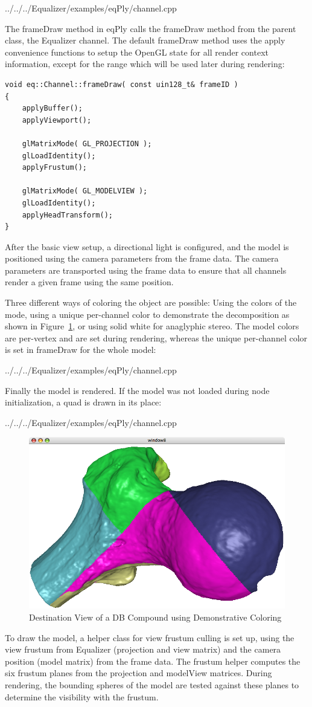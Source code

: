 \documentclass[10pt,a4]{scrartcl}
\newcommand{\fig}[1]{Figure~\ref{#1}}
\begin{document}
{\footnotesize
  {../../../Equalizer/examples/eqPly/channel.cpp}}

The \textsf{frameDraw} method in \textsf{eqPly} calls the \textsf{frameDraw}
method from the parent class, the Equalizer channel. The default
\textsf{frameDraw} method uses the apply convenience functions to setup the
OpenGL state for all render context information, except for the range which will
be used later during rendering:

{\footnotesize\begin{lstlisting}
void eq::Channel::frameDraw( const uin128_t& frameID )
{
    applyBuffer();
    applyViewport();
    
    glMatrixMode( GL_PROJECTION );
    glLoadIdentity();
    applyFrustum();

    glMatrixMode( GL_MODELVIEW );
    glLoadIdentity();
    applyHeadTransform();
}
\end{lstlisting}}

After the basic view setup, a directional light is configured, and the
model is positioned using the camera parameters from the frame data. The
camera parameters are transported using the frame data to ensure
that all channels render a given frame using the same position.

Three different ways of coloring the object are possible: Using the
colors of the mode, using a unique per-channel color to demonstrate the
decomposition as shown in \fig{fDBDest}, or using solid white for
anaglyphic stereo. The model colors are per-vertex and are set during
rendering, whereas the unique per-channel color is set in
\textsf{frameDraw} for the whole model:

{\footnotesize
  {../../../Equalizer/examples/eqPly/channel.cpp}}

Finally the model is rendered. If the model was not loaded during node
initialization, a quad is drawn in its place:

{\footnotesize
  {../../../Equalizer/examples/eqPly/channel.cpp}}

\begin{figure}
  \includegraphics[width=.382\textwidth]{images/DB.png}
  {\caption{\label{fDBDest}Destination View of a DB Compound using
      Demonstrative Coloring}}
\end{figure}
To draw the model, a helper class for view frustum culling is set up, using the
view frustum from Equalizer (projection and view matrix) and the camera position
(model matrix) from the frame data. The frustum helper computes the six frustum
planes from the projection and modelView matrices. During rendering, the
bounding spheres of the model are tested against these planes to determine the
visibility with the frustum.
\end{document}
